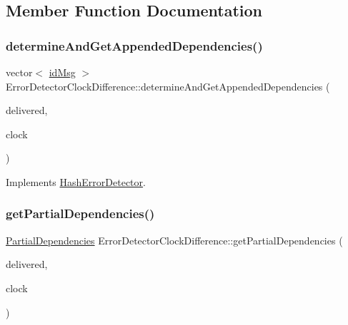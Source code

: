 \subsection{Member Function Documentation}
\mbox{\label{classErrorDetectorClockDifference_a15406c8d7652f3b9358b1958d3723933}} 
\subsubsection{\texorpdfstring{determine\+And\+Get\+Appended\+Dependencies()}{determineAndGetAppendedDependencies()}}
{\footnotesize\ttfamily vector$<$ \hyperlink{structures_8h_a83a1d9a070efa5341da84cfd8e28d3e5}{id\+Msg} $>$ Error\+Detector\+Clock\+Difference\+::determine\+And\+Get\+Appended\+Dependencies (\begin{DoxyParamCaption}\item[{const vector$<$ \hyperlink{structures_8h_a7e7bdc1d2fff8a9436f2f352b2711ed6}{message\+Info} $>$ \&}]{delivered,  }\item[{const \hyperlink{classProbabilisticClock}{Probabilistic\+Clock} \&}]{clock }\end{DoxyParamCaption})\hspace{0.3cm}{\ttfamily [virtual]}}



Implements \hyperlink{classHashErrorDetector_ae45353331e29b50a0aa2fc6dd540ed4e}{Hash\+Error\+Detector}.

\mbox{\label{classErrorDetectorClockDifference_a26f4c2905859947201d0a18146f2e961}} 
\subsubsection{\texorpdfstring{get\+Partial\+Dependencies()}{getPartialDependencies()}}
{\footnotesize\ttfamily \hyperlink{classPartialDependencies}{Partial\+Dependencies} Error\+Detector\+Clock\+Difference\+::get\+Partial\+Dependencies (\begin{DoxyParamCaption}\item[{const vector$<$ \hyperlink{structures_8h_a7e7bdc1d2fff8a9436f2f352b2711ed6}{message\+Info} $>$ \&}]{delivered,  }\item[{const \hyperlink{classProbabilisticClock}{Probabilistic\+Clock} \&}]{clock }\end{DoxyParamCaption})\hspace{0.3cm}{\ttfamily [virtual]}}



